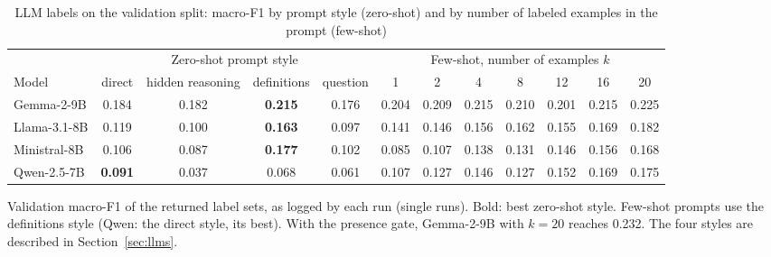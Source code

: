 \begin{table}[t]
\caption{LLM labels on the validation split: macro-F1 by prompt style (zero-shot) and by number of labeled examples in the prompt (few-shot)}
\label{tab:prompts}
\centering
\footnotesize
\setlength{\tabcolsep}{4pt}
\begin{tabular*}{\textwidth}{@{\extracolsep{\fill}}lcccc ccccccc@{}}
\toprule
 & \multicolumn{4}{c}{Zero-shot prompt style} & \multicolumn{7}{c}{Few-shot, number of examples $k$} \\
\cmidrule(lr){2-5}\cmidrule(l){6-12}
Model & direct & hidden reasoning & definitions & question & 1 & 2 & 4 & 8 & 12 & 16 & 20 \\
\midrule
Gemma-2-9B & 0.184 & 0.182 & \textbf{0.215} & 0.176 & 0.204 & 0.209 & 0.215 & 0.210 & 0.201 & 0.215 & 0.225 \\
Llama-3.1-8B & 0.119 & 0.100 & \textbf{0.163} & 0.097 & 0.141 & 0.146 & 0.156 & 0.162 & 0.155 & 0.169 & 0.182 \\
Ministral-8B & 0.106 & 0.087 & \textbf{0.177} & 0.102 & 0.085 & 0.107 & 0.138 & 0.131 & 0.146 & 0.156 & 0.168 \\
Qwen-2.5-7B & \textbf{0.091} & 0.037 & 0.068 & 0.061 & 0.107 & 0.127 & 0.146 & 0.127 & 0.152 & 0.169 & 0.175 \\
\bottomrule
\end{tabular*}
\par\vspace{2pt}
\begin{minipage}{\textwidth}\scriptsize Validation macro-F1 of the returned label sets, as logged by each run (single runs). Bold: best zero-shot style. Few-shot prompts use the definitions style (Qwen: the direct style, its best). With the presence gate, Gemma-2-9B with $k = 20$ reaches 0.232. The four styles are described in Section~\ref{sec:llms}.\end{minipage}
\end{table}
